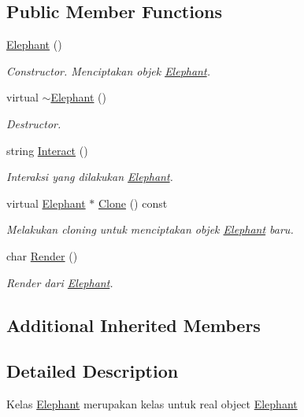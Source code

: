 \subsection*{Public Member Functions}
\begin{DoxyCompactItemize}
\item 
\hyperlink{classElephant_a372cc81064310f2f96db175b747647cb}{Elephant} ()
\begin{DoxyCompactList}\small\item\em Constructor. Menciptakan objek \hyperlink{classElephant}{Elephant}. \end{DoxyCompactList}\item 
virtual \hyperlink{classElephant_aed5fb7142a24a101330af52652909075}{$\sim$\+Elephant} ()
\begin{DoxyCompactList}\small\item\em Destructor. \end{DoxyCompactList}\item 
string \hyperlink{classElephant_a4f2c4bef5ec886019ee88ad575f94fa7}{Interact} ()
\begin{DoxyCompactList}\small\item\em Interaksi yang dilakukan \hyperlink{classElephant}{Elephant}. \end{DoxyCompactList}\item 
virtual \hyperlink{classElephant}{Elephant} $\ast$ \hyperlink{classElephant_a723a7c90f44a95d9886163e605aecea7}{Clone} () const 
\begin{DoxyCompactList}\small\item\em Melakukan cloning untuk menciptakan objek \hyperlink{classElephant}{Elephant} baru. \end{DoxyCompactList}\item 
char \hyperlink{classElephant_a7e412f36e1f88cd278dea76d4f383e95}{Render} ()
\begin{DoxyCompactList}\small\item\em Render dari \hyperlink{classElephant}{Elephant}. \end{DoxyCompactList}\end{DoxyCompactItemize}
\subsection*{Additional Inherited Members}


\subsection{Detailed Description}
Kelas \hyperlink{classElephant}{Elephant} merupakan kelas untuk real object \hyperlink{classElephant}{Elephant} 

